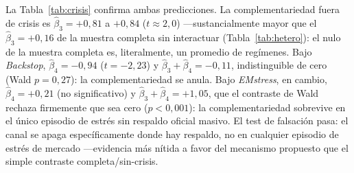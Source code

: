 \begin{table}[t]
\centering\small
{}
\caption[Interacción de crisis: sin botar trimestres (especificación de referencia)]{Ecuación~\eqref{eq:crisisint}, efectos fijos país+tiempo (columna CM4/PT de las Tablas~\ref{tab:crisis-bateria-A}--\ref{tab:crisis-bateria-B}), seis controles domésticos, errores de Driscoll--Kraay. $\hat\beta_3$ es idéntico dentro de cada bloque (mismo término base); se repite por fila para lectura directa de $\hat\beta_3+\hat\beta_4$. Trazabilidad: \texttt{bbg/p9\_crisis\_interaccion.py} = \texttt{bbg/crisis\_interaccion.R} (coinciden a 4 decimales); reproducido también en el notebook Jupyter y en \texttt{analisis\_bloomberg.Rmd}.}
\label{tab:crisis}
\end{table}

La Tabla~\ref{tab:crisis} confirma ambas predicciones. La complementariedad fuera de crisis es $\hat\beta_3=+0{,}81$ a $+0{,}84$ ($t\approx2{,}0$) —sustancialmente mayor que el $\hat\beta_3=+0{,}16$ de la muestra completa sin interactuar (Tabla~\ref{tab:hetero}): el nulo de la muestra completa es, literalmente, un promedio de regímenes. Bajo \textit{Backstop}, $\hat\beta_4=-0{,}94$ ($t=-2{,}23$) y $\hat\beta_3+\hat\beta_4=-0{,}11$, indistinguible de cero (Wald $p=0{,}27$): la complementariedad se anula. Bajo \textit{EMstress}, en cambio, $\hat\beta_4=+0{,}21$ (no significativo) y $\hat\beta_3+\hat\beta_4=+1{,}05$, que el contraste de Wald rechaza firmemente que sea cero ($p<0{,}001$): la complementariedad sobrevive en el único episodio de estrés sin respaldo oficial masivo. El test de falsación pasa: el canal se apaga específicamente donde hay respaldo, no en cualquier episodio de estrés de mercado —evidencia más nítida a favor del mecanismo propuesto que el simple contraste completa/sin-crisis.

